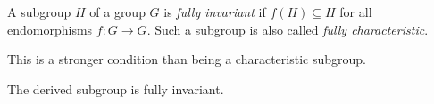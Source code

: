 \documentclass[12pt]{article}
\begin{document}
A subgroup $H$ of a group $G$ is \emph{fully invariant} if  $f(H) \subseteq H$
for all endomorphisms $f \colon G \to G$.  Such a subgroup is also called \emph{fully characteristic}.

This is a stronger condition than being a characteristic subgroup.

The derived subgroup is fully invariant.
\end{document}
